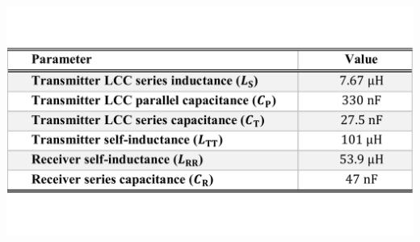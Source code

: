 \documentclass[journal,a4paper]{IEEEtran}
\begin{document}
\appendix
\begin{table}[!h]
\vspace{-3mm}
\renewcommand{\arraystretch}{1.3}
\caption{Simulation and Experimental Specifications.}
\centering
\label{TBL1}
	    \vspace{-2mm}
	    \includegraphics[clip,trim= 0cm 3.5cm 0cm 3.5cm,width=0.95\columnwidth]{Figs/TBL1.pdf}
\vspace{-5mm}
\end{table}

\ifCLASSOPTIONcaptionsoff
  \newpage
\fi



\end{document}
